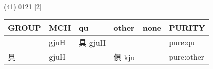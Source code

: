 \documentclass[14pt,a4paper]{scrartcl}
\begin{document}
(41) 0121 {[}2{]}

\begin{longtable}[c]{@{}llllll@{}}
\toprule
\begin{minipage}[b]{0.14\columnwidth}\raggedright\strut
GROUP
\strut\end{minipage} &
\begin{minipage}[b]{0.14\columnwidth}\raggedright\strut
MCH
\strut\end{minipage} &
\begin{minipage}[b]{0.14\columnwidth}\raggedright\strut
qu
\strut\end{minipage} &
\begin{minipage}[b]{0.14\columnwidth}\raggedright\strut
other
\strut\end{minipage} &
\begin{minipage}[b]{0.14\columnwidth}\raggedright\strut
none
\strut\end{minipage} &
\begin{minipage}[b]{0.14\columnwidth}\raggedright\strut
PURITY
\strut\end{minipage}\tabularnewline
\midrule
\endhead
\begin{minipage}[t]{0.14\columnwidth}\raggedright\strut
𥃲
\strut\end{minipage} &
\begin{minipage}[t]{0.14\columnwidth}\raggedright\strut
gjuH
\strut\end{minipage} &
\begin{minipage}[t]{0.14\columnwidth}\raggedright\strut
具 gjuH
\strut\end{minipage} &
\begin{minipage}[t]{0.14\columnwidth}\raggedright\strut
\strut\end{minipage} &
\begin{minipage}[t]{0.14\columnwidth}\raggedright\strut
\strut\end{minipage} &
\begin{minipage}[t]{0.14\columnwidth}\raggedright\strut
pure:qu
\strut\end{minipage}\tabularnewline
\begin{minipage}[t]{0.14\columnwidth}\raggedright\strut
具
\strut\end{minipage} &
\begin{minipage}[t]{0.14\columnwidth}\raggedright\strut
gjuH
\strut\end{minipage} &
\begin{minipage}[t]{0.14\columnwidth}\raggedright\strut
\strut\end{minipage} &
\begin{minipage}[t]{0.14\columnwidth}\raggedright\strut
俱 kju
\strut\end{minipage} &
\begin{minipage}[t]{0.14\columnwidth}\raggedright\strut
\strut\end{minipage} &
\begin{minipage}[t]{0.14\columnwidth}\raggedright\strut
pure:other
\strut\end{minipage}\tabularnewline
\bottomrule
\end{longtable}
\end{document}
